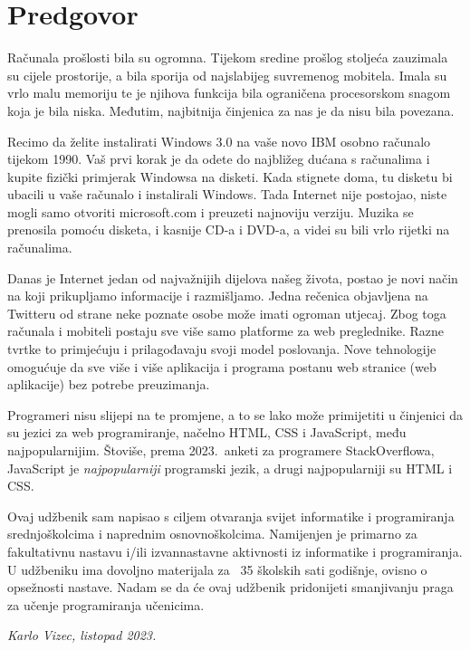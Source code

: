 \chapter*{Predgovor}\label{ch:predgovor}

Računala prošlosti bila su ogromna.
Tijekom sredine prošlog stoljeća zauzimala su cijele prostorije, a bila sporija od najslabijeg suvremenog mobitela.
Imala su vrlo malu memoriju te je njihova funkcija bila ograničena procesorskom snagom koja je bila niska.
Međutim, najbitnija činjenica za nas je da nisu bila povezana.

Recimo da želite instalirati Windows 3.0 na vaše novo IBM osobno računalo tijekom 1990.
Vaš prvi korak je da odete do najbližeg dućana s računalima i kupite fizički primjerak Windowsa na disketi.
Kada stignete doma, tu disketu bi ubacili u vaše računalo i instalirali Windows.
Tada Internet nije postojao, niste mogli samo otvoriti microsoft.com i preuzeti najnoviju verziju.
Muzika se prenosila pomoću disketa, i kasnije CD-a i DVD-a, a videi su bili vrlo rijetki na računalima.

Danas je Internet jedan od najvažnijih dijelova našeg života, postao je novi način na koji prikupljamo informacije i razmišljamo.
Jedna rečenica objavljena na Twitteru od strane neke poznate osobe može imati ogroman utjecaj.
Zbog toga računala i mobiteli postaju sve više samo platforme za web preglednike.
Razne tvrtke to primjećuju i prilagođavaju svoji model poslovanja.
Nove tehnologije omogućuje da sve više i više aplikacija i programa postanu web stranice (web aplikacije) bez potrebe preuzimanja.

Programeri nisu slijepi na te promjene, a to se lako može primijetiti u činjenici da su jezici za web programiranje, načelno HTML, CSS i JavaScript, među najpopularnijim.
Štoviše, prema 2023.\ anketi za programere StackOverflowa, JavaScript je \textit{najpopularniji} programski jezik, a drugi najpopularniji su HTML i CSS.

Ovaj udžbenik sam napisao s ciljem otvaranja svijet informatike i programiranja srednjoškolcima i naprednim osnovnoškolcima.
Namijenjen je primarno za fakultativnu nastavu i/ili izvannastavne aktivnosti iz informatike i programiranja.
U udžbeniku ima dovoljno materijala za ~35 školskih sati godišnje, ovisno o opsežnosti nastave.
Nadam se da će ovaj udžbenik pridonijeti smanjivanju praga za učenje programiranja učenicima.

\medskip
\begin {flushright}
    \textit{Karlo Vizec, listopad 2023.}
\end {flushright}


